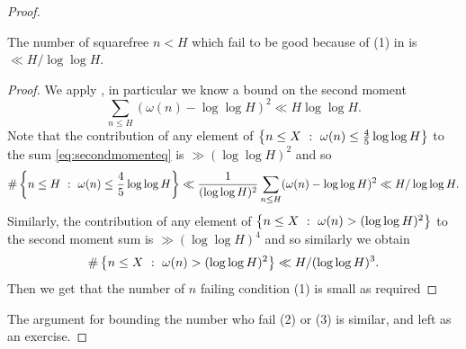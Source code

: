 \documentclass{lecturenotes}
\numberwithin{equation}{section}
\begin{document}
\begin{proof}
\begin{lemma}
The number of squarefree $n<H$ which fail to be good because of (1) in  is $\ll H/\log\log H$.
\end{lemma}
\begin{proof}
We apply , in particular we know a bound on the second moment
\begin{equation}\label{eq:secondmomenteq}\sum_{n\leq H}(\omega(n)-\log\log H)^2\ll H\log\log H.\end{equation}
Note that the contribution of any element of $\left\{{n\leq X~:~\omega(n)\leq \frac{4}{5}\log\log H}\right\}$ to the sum \eqref{eq:secondmomenteq} is $\gg (\log\log H)^2$ and so
\[\#\left\{{n\leq H~:~\omega(n)\leq \frac{4}{5}\log\log H}\right\}\ll \frac{1}{(\log\log H)^2}\sum_{n\leq H}(\omega(n)-\log \log H)^2\ll H/\log\log H.\]Similarly, the contribution of any element of $\left\{{n\leq X~:~\omega(n)>(\log\log H)^2}\right\}$ to the second moment sum is $\gg (\log\log H)^4$ and so similarly we obtain
\[\#\left\{{n\leq X~:~\omega(n)>(\log\log H)^2}\right\}\ll H/(\log\log H)^3.\]
Then we get that the number of $n$ failing condition (1) is small as required
\end{proof}
The argument for bounding the number who fail (2) or (3) is similar, and left as an exercise.
\end{proof}
\lecture{}{}
\end{document}
